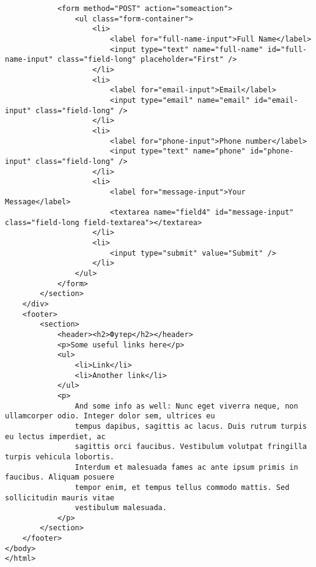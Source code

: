 \begin{lstlisting}
            <form method="POST" action="someaction">
                <ul class="form-container">
                    <li>
                        <label for="full-name-input">Full Name</label>
                        <input type="text" name="full-name" id="full-name-input" class="field-long" placeholder="First" />
                    </li>
                    <li>
                        <label for="email-input">Email</label>
                        <input type="email" name="email" id="email-input" class="field-long" />
                    </li>
                    <li>
                        <label for="phone-input">Phone number</label>
                        <input type="text" name="phone" id="phone-input" class="field-long" />
                    </li>
                    <li>
                        <label for="message-input">Your Message</label>
                        <textarea name="field4" id="message-input" class="field-long field-textarea"></textarea>
                    </li>
                    <li>
                        <input type="submit" value="Submit" />
                    </li>
                </ul>
            </form>
        </section>
    </div>
    <footer>
        <section>
            <header><h2>Футер</h2></header>
            <p>Some useful links here</p>
            <ul>
                <li>Link</li>
                <li>Another link</li>
            </ul>
            <p>
                And some info as well: Nunc eget viverra neque, non ullamcorper odio. Integer dolor sem, ultrices eu
                tempus dapibus, sagittis ac lacus. Duis rutrum turpis eu lectus imperdiet, ac
                sagittis orci faucibus. Vestibulum volutpat fringilla turpis vehicula lobortis.
                Interdum et malesuada fames ac ante ipsum primis in faucibus. Aliquam posuere 
                tempor enim, et tempus tellus commodo mattis. Sed sollicitudin mauris vitae 
                vestibulum malesuada. 
            </p>
        </section>
    </footer>
</body>
</html>
\end{lstlisting}

